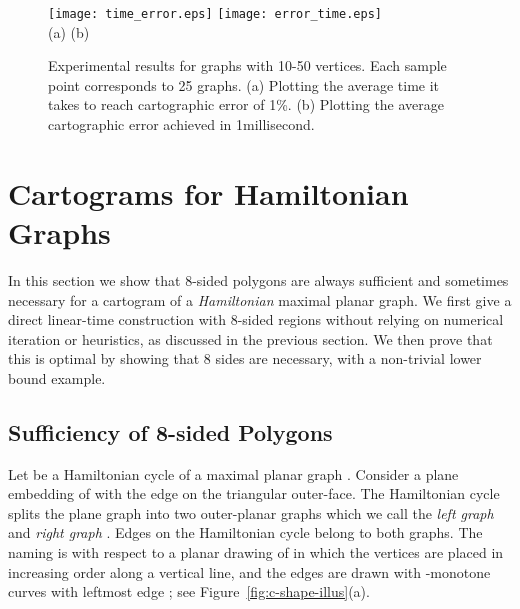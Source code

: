 \documentclass[11pt]{article}
\begin{document}
\begin{figure}[htbp]
\centering
\texttt{[image: time\_error.eps]}\hspace{.0cm}
\texttt{[image: error\_time.eps]}\\
 (a) \hspace{7cm} (b)\\
\caption{\small\sf Experimental results for graphs with 10-50 vertices. Each sample point corresponds to 25 graphs. (a) Plotting the average time it takes to reach cartographic error of 1\%. (b) Plotting the average cartographic error achieved in 1millisecond. }
\label{fig:exp}
\end{figure}











\section{Cartograms for Hamiltonian Graphs}
\label{sec:ham}

In this section we show that 8-sided polygons are always sufficient
and sometimes necessary for a cartogram of a {\em
 Hamiltonian} maximal planar graph.
 We first give a direct linear-time construction with 8-sided regions
 without relying on numerical iteration or heuristics, as discussed in the previous section.
 We then prove that this is optimal by showing that 8 sides are necessary, with a non-trivial lower bound example.

\subsection{Sufficiency of 8-sided Polygons}

Let  be a Hamiltonian cycle of a maximal planar graph
  . Consider a plane embedding of  with the edge  on the triangular outer-face. The Hamiltonian cycle splits the plane
 graph  into two outer-planar graphs which we call the {\em left
   graph } and {\em right graph }. Edges on the Hamiltonian cycle belong to both graphs.
 The naming is with respect to a planar drawing  of  in which the
vertices
  are placed in increasing order along a vertical
 line, and the edges are drawn with -monotone curves with leftmost
 edge ; see Figure~\ref{fig:c-shape-illus}(a).
\end{document}
